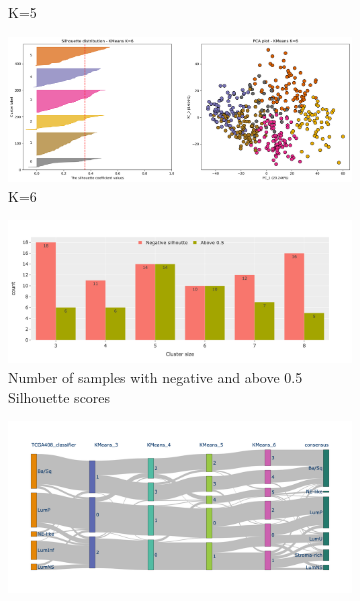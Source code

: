 \begin{figure}[!t]
\begin{subfigure}[!t]{0.49\textwidth}
        \caption{K=5}
    \end{subfigure}
    \centering
    \begin{subfigure}[!t]{0.49\textwidth}
        \includegraphics[width=\textwidth]{Sections/ClusteringAnalysis/Resources/cs_top3/sill_distrib/KMeans_6_sill_distrib.png}
        \caption{K=6}
    \end{subfigure}
    \centering
    \begin{subfigure}[!t]{0.49\textwidth}
        \includegraphics[width=\textwidth, keepaspectratio]{Sections/ClusteringAnalysis/Resources/cs_top3/sill_distrib/sill_neg_above_th.png}
        \caption{Number of samples with negative and above 0.5 Silhouette scores}
    \end{subfigure}
    \centering
     \begin{subfigure}[!t]{0.49\textwidth}
        \includegraphics[width=\textwidth, keepaspectratio]{Sections/ClusteringAnalysis/Resources/cs_top3/sill_distrib/sky_kMeans.png}

\end{subfigure}
\end{figure}
